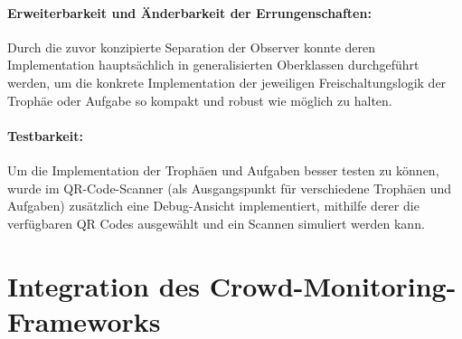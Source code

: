 \paragraph{Erweiterbarkeit und Änderbarkeit der Errungenschaften:} Durch die zuvor konzipierte Separation der Observer konnte deren Implementation hauptsächlich in generalisierten Oberklassen durchgeführt werden, um die konkrete Implementation der jeweiligen Freischaltungslogik der Trophäe oder Aufgabe so kompakt und robust wie möglich zu halten.

\paragraph{Testbarkeit:} Um die Implementation der Trophäen und Aufgaben besser testen zu können, wurde im QR-Code-Scanner (als Ausgangspunkt für verschiedene Trophäen und Aufgaben) zusätzlich eine Debug-Ansicht implementiert, mithilfe derer die verfügbaren QR Codes ausgewählt und ein Scannen simuliert werden kann.

\section{Integration des Crowd-Monitoring-Frameworks}

